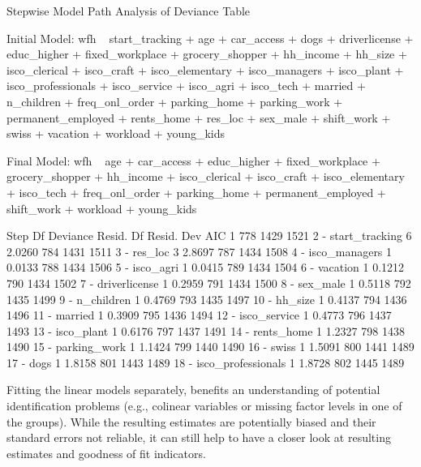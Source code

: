 \documentclass[%
    twoside, openright, titlepage, numbers=noenddot,%
    cleardoublepage=empty,%
    abstract=false,%
    BCOR=5.5mm, paper=a5, fontsize=10pt,%
]{scrreprt}
\begin{document}
\begin{Schunk}
\begin{Soutput}
Stepwise Model Path 
Analysis of Deviance Table

Initial Model:
wfh ~ start_tracking + age + car_access + dogs + driverlicense + 
    educ_higher + fixed_workplace + grocery_shopper + hh_income + 
    hh_size + isco_clerical + isco_craft + isco_elementary + 
    isco_managers + isco_plant + isco_professionals + isco_service + 
    isco_agri + isco_tech + married + n_children + freq_onl_order + 
    parking_home + parking_work + permanent_employed + rents_home + 
    res_loc + sex_male + shift_work + swiss + vacation + workload + 
    young_kids

Final Model:
wfh ~ age + car_access + educ_higher + fixed_workplace + grocery_shopper + 
    hh_income + isco_clerical + isco_craft + isco_elementary + 
    isco_tech + freq_onl_order + parking_home + permanent_employed + 
    shift_work + workload + young_kids


                   Step Df Deviance Resid. Df Resid. Dev  AIC
1                                         778       1429 1521
2      - start_tracking  6   2.0260       784       1431 1511
3             - res_loc  3   2.8697       787       1434 1508
4       - isco_managers  1   0.0133       788       1434 1506
5           - isco_agri  1   0.0415       789       1434 1504
6            - vacation  1   0.1212       790       1434 1502
7       - driverlicense  1   0.2959       791       1434 1500
8            - sex_male  1   0.5118       792       1435 1499
9          - n_children  1   0.4769       793       1435 1497
10            - hh_size  1   0.4137       794       1436 1496
11            - married  1   0.3909       795       1436 1494
12       - isco_service  1   0.4773       796       1437 1493
13         - isco_plant  1   0.6176       797       1437 1491
14         - rents_home  1   1.2327       798       1438 1490
15       - parking_work  1   1.1424       799       1440 1490
16              - swiss  1   1.5091       800       1441 1489
17               - dogs  1   1.8158       801       1443 1489
18 - isco_professionals  1   1.8728       802       1445 1489
\end{Soutput}
\end{Schunk}
%
Fitting the linear models separately, benefits an understanding of potential identification problems (e.g., colinear variables or missing factor levels in one of the groups). While the resulting estimates are potentially biased and their standard errors not reliable, it can still help to have a closer look at resulting estimates and goodness of fit indicators.
\end{document}
